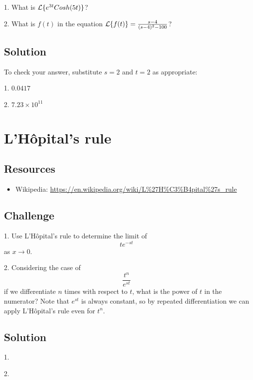 1. What is $\mathcal{L}\{e^{3t} Cosh(5t)\}$?

2. What is $f(t)$ in the equation $\mathcal{L}\{f(t)\} = \frac{s-4}{(s-4)^2-100}$?

\subsection*{Solution}
To check your answer, substitute $s=2$ and $t=2$ as appropriate:

1. $0.0417$

2. $7.23 \times 10^{11}$




\newpage
\section{L'H\^opital's rule}

\subsection*{Resources}
\begin{itemize}
    \item Wikipedia: \url{https://en.wikipedia.org/wiki/L\%27H\%C3\%B4pital\%27s_rule}
\end{itemize}

\subsection*{Challenge}
1. Use L'H\^opital's rule to determine the limit of
\begin{equation}
    t e^{-st}
\end{equation}
as $x \rightarrow 0$.

2. Considering the case of
\begin{equation}
    \frac{t^n}{e^{st}}
\end{equation}
if we differentiate $n$ times with respect to $t$, what is the power of $t$ in the numerator? Note that $e^{st}$ is always constant, so by repeated differentiation we can apply L'H\^opital's rule even for $t^n$.

\subsection*{Solution}
1. 

2. 




